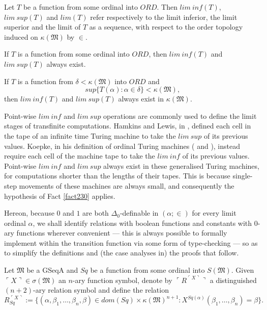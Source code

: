 \documentclass[12pt]{article}
\numberwithin{equation}{section}
\begin{document}
\begin{defi}
Let $T$ be a function from some ordinal into $ORD$. Then $lim \ inf (T)$, $lim \ sup (T)$ and $lim(T)$ refer respectively to the limit inferior, the limit superior and the limit of $T$ as a sequence, with respect to the order topology induced on $\kappa(\mathfrak{M})$ by $\in$.
\end{defi}

\begin{fact}
If $T$ is a function from some ordinal into $ORD$, then $lim \ inf (T)$ and $lim \ sup (T)$ always exist.
\end{fact}

\begin{fact}\label{fact230}
If $T$ is a function from $\delta < \kappa(\mathfrak{M})$ into $ORD$ and
\begin{equation*}
    sup \{T(\alpha) : \alpha \in \delta\} < \kappa(\mathfrak{M}) \text{,}
\end{equation*}
then $lim \ inf (T)$ and $lim \ sup (T)$ always exist in $\kappa(\mathfrak{M})$.
\end{fact}

Point-wise $lim \ inf$ and $lim \ sup$ operations are commonly used to define the limit stages of transfinite computations. Hamkins and Lewis, in \cite{ittm}, defined each cell in the tape of an infinite time Turing machine to take the $lim \ sup$ of its previous values. Koepke, in his definition of ordinal Turing machines (\cite{koepke1} and \cite{koepke2}), instead require each cell of the machine tape to take the $lim \ inf$ of its previous values. Point-wise $lim \ inf$ and $lim \ sup$ always exist in these generalised Turing machines, for computations shorter than the lengths of their tapes. This is because single-step movements of these machines are always small, and consequently the hypothesis of Fact \ref{fact230} applies.

Hereon, because $0$ and $1$ are both $\Delta_0$-definable in $(\alpha; \in)$ for every limit ordinal $\alpha$, we shall identify relations with boolean functions and constants with $0$-ary functions wherever convenient --- this is always possible to formally implement within the transition function via some form of type-checking --- so as to simplify the definitions and (the case analyses in) the proofs that follow. 

\begin{defi}
Let $\mathfrak{M}$ be a GSeqA and $Sq$ be a function from some ordinal into $S(\mathfrak{M})$. Given $\ulcorner X \urcorner \in \sigma(\mathfrak{M})$ an $n$-ary function symbol, denote by $\ulcorner R^{\ulcorner X \urcorner} \urcorner$ a distinguished $(n+2)$-ary relation symbol and define the relation 
\begin{equation*}
    R_{Sq}^{\ulcorner X \urcorner} := \{(\alpha, \beta_1, \dots, \beta_n, \beta) \in dom(Sq) \times \kappa(\mathfrak{M})^{n+1} : X^{Sq(\alpha)} (\beta_1, \dots, \beta_n) = \beta\} \text{.}
\end{equation*}
\end{defi}
\end{document}
